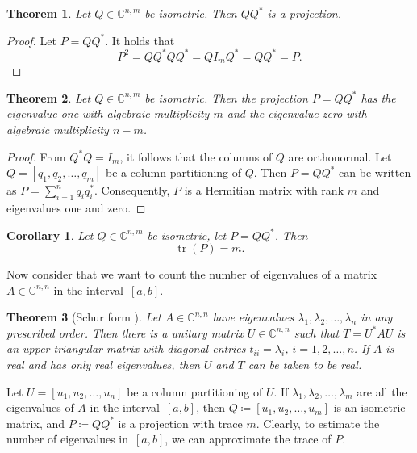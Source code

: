 \documentclass[%
	paper=a4,
	fontsize=10pt,
	DIV11,BCOR10mm,
	numbers=noenddot,
	abstract=yes
]{scrartcl}
\newcommand{\F}{\mathbb{C}}
\newtheorem{theorem}{Theorem}[section]
\newtheorem{corollary}{Corollary}[section]
\theoremstyle{definition}
\begin{document}
\begin{theorem}
	Let $Q \in \F^{n,m}$ be isometric. Then $Q Q^*$ is a projection.
\end{theorem}

\begin{proof}
	Let $P = Q Q^*$. It holds that
	\[ P^2 = Q Q^* Q Q^* = Q I_m Q^* = Q Q^* = P. \]
\end{proof}

\begin{theorem}
	Let $Q \in \F^{n,m}$ be isometric. Then the projection $P = Q Q^*$ has the
	eigenvalue one with algebraic multiplicity $m$ and the eigenvalue zero with
	algebraic multiplicity $n - m$.
\end{theorem}

\begin{proof}
	From $Q^* Q = I_m$, it follows that the columns of $Q$ are orthonormal. Let
	$Q = [q_1, q_2, \dotsc, q_m]$ be a column-partitioning of $Q$. Then $P = Q
	Q^*$ can be written as $P = \sum_{i=1}^n q_i q_i^*$. Consequently, $P$ is a
	Hermitian matrix with rank $m$ and eigenvalues one and zero.
\end{proof}

\begin{corollary}
	Let $Q \in \F^{n,m}$ be isometric, let $P = Q Q^*$. Then
	\[ \operatorname{tr}(P) = m. \]
\end{corollary}

Now consider that we want to count the number of eigenvalues of a matrix $A \in
\F^{n,n}$ in the interval~$[a, b]$.

\begin{theorem}[Schur form {\cite[Theorem~2.3.1]{Horn2012}}]
	Let $A \in \F^{n,n}$ have eigenvalues $\lambda_1, \lambda_2, \dotsc,
	\lambda_n$ in any prescribed order. Then there is a unitary matrix $U \in
	\F^{n,n}$ such that $T = U^* A U$ is an upper triangular matrix with
	diagonal entries $t_{ii} = \lambda_i$, $i = 1, 2, \dotsc, n$. If $A$ is real
	and has only real eigenvalues, then $U$ and $T$ can be taken to be real.
\end{theorem}

Let $U = [u_1, u_2, \dotsc, u_n]$ be a column partitioning of $U$. If
$\lambda_1, \lambda_2, \dotsc, \lambda_m$ are all the eigenvalues of $A$ in the
interval~$[a, b]$, then $Q \coloneqq [u_1, u_2, \dotsc, u_m]$ is an isometric
matrix, and $P \coloneqq Q Q^*$ is a projection with trace $m$. Clearly, to
estimate the number of eigenvalues in~$[a, b]$, we can approximate the trace of
$P$.
\end{document}
